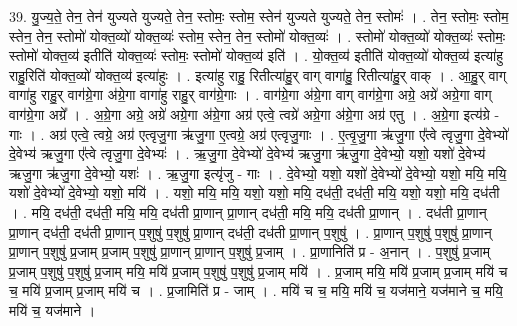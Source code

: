 \documentclass[17pt]{extarticle}
\begin{document}
39. यु॒ज्य॒ते॒ तेन॒ तेन॑ युज्यते युज्यते॒ तेन॒ स्तोमः॒ स्तोम॒ स्तेन॑ युज्यते युज्यते॒ तेन॒ स्तोमः॑ । . तेन॒ स्तोमः॒ स्तोम॒ स्तेन॒ तेन॒ स्तोमो॑ योक्त॒व्यो॑ योक्त॒व्यः॑ स्तोम॒ स्तेन॒ तेन॒ स्तोमो॑ योक्त॒व्यः॑ । . स्तोमो॑ योक्त॒व्यो॑ योक्त॒व्यः॑ स्तोमः॒ स्तोमो॑ योक्त॒व्य॑ इतीति॑ योक्त॒व्यः॑ स्तोमः॒ स्तोमो॑ योक्त॒व्य॑ इति॑ । . यो॒क्त॒व्य॑ इतीति॑ योक्त॒व्यो॑ योक्त॒व्य॑ इत्या॑हु राहु॒रिति॑ योक्त॒व्यो॑ योक्त॒व्य॑ इत्या॑हुः । . इत्या॑हु राहु॒ रितीत्या॑हु॒र् वाग् वागा॑हु॒ रितीत्या॑हु॒र् वाक् । . आ॒हु॒र् वाग् वागा॑हु राहु॒र् वाग॑ग्रे॒गा अ॑ग्रे॒गा वागा॑हु राहु॒र् वाग॑ग्रे॒गाः । . वाग॑ग्रे॒गा अ॑ग्रे॒गा वाग् वाग॑ग्रे॒गा अग्रे॒ अग्रे॑ अग्रे॒गा वाग् वाग॑ग्रे॒गा अग्रे᳚ । . अ॒ग्रे॒गा अग्रे॒ अग्रे॑ अग्रे॒गा अ॑ग्रे॒गा अग्र॑ एत्वे॒ त्वग्रे॑ अग्रे॒गा अ॑ग्रे॒गा अग्र॑ एतु । . अ॒ग्रे॒गा इत्य॑ग्रे - गाः । . अग्र॑ एत्वे॒ त्वग्रे॒ अग्र॑ एत्वृजु॒गा ऋ॑जु॒गा ए॒त्वग्रे॒ अग्र॑ एत्वृजु॒गाः । . ए॒त्वृ॒जु॒गा ऋ॑जु॒गा ए᳚त्वे त्वृजु॒गा दे॒वेभ्यो॑ दे॒वेभ्य॑ ऋजु॒गा ए᳚त्वे त्वृजु॒गा दे॒वेभ्यः॑ । . ऋ॒जु॒गा दे॒वेभ्यो॑ दे॒वेभ्य॑ ऋजु॒गा ऋ॑जु॒गा दे॒वेभ्यो॒ यशो॒ यशो॑ दे॒वेभ्य॑ ऋजु॒गा ऋ॑जु॒गा दे॒वेभ्यो॒ यशः॑ । . ऋ॒जु॒गा इत्यृ॑जु - गाः । . दे॒वेभ्यो॒ यशो॒ यशो॑ दे॒वेभ्यो॑ दे॒वेभ्यो॒ यशो॒ मयि॒ मयि॒ यशो॑ दे॒वेभ्यो॑ दे॒वेभ्यो॒ यशो॒ मयि॑ । . यशो॒ मयि॒ मयि॒ यशो॒ यशो॒ मयि॒ दध॑ती॒ दध॑ती॒ मयि॒ यशो॒ यशो॒ मयि॒ दध॑ती । . मयि॒ दध॑ती॒ दध॑ती॒ मयि॒ मयि॒ दध॑ती प्रा॒णान् प्रा॒णान् दध॑ती॒ मयि॒ मयि॒ दध॑ती प्रा॒णान् । . दध॑ती प्रा॒णान् प्रा॒णान् दध॑ती॒ दध॑ती प्रा॒णान् प॒शुषु॑ प॒शुषु॑ प्रा॒णान् दध॑ती॒ दध॑ती प्रा॒णान् प॒शुषु॑ । . प्रा॒णान् प॒शुषु॑ प॒शुषु॑ प्रा॒णान् प्रा॒णान् प॒शुषु॑ प्र॒जाम् प्र॒जाम् प॒शुषु॑ प्रा॒णान् प्रा॒णान् प॒शुषु॑ प्र॒जाम् । . प्रा॒णानिति॑ प्र - अ॒नान् । . प॒शुषु॑ प्र॒जाम् प्र॒जाम् प॒शुषु॑ प॒शुषु॑ प्र॒जाम् मयि॒ मयि॑ प्र॒जाम् प॒शुषु॑ प॒शुषु॑ प्र॒जाम् मयि॑ । . प्र॒जाम् मयि॒ मयि॑ प्र॒जाम् प्र॒जाम् मयि॑ च च॒ मयि॑ प्र॒जाम् प्र॒जाम् मयि॑ च । . प्र॒जामिति॑ प्र - जाम् । . मयि॑ च च॒ मयि॒ मयि॑ च॒ यज॑माने॒ यज॑माने च॒ मयि॒ मयि॑ च॒ यज॑माने । \newline
\pagebreak
{}
\end{document}
